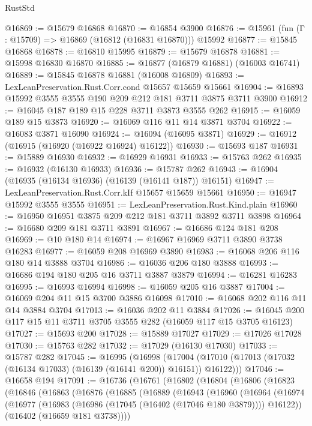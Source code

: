 \begin{lexlean}{RustStd}
\begin{coremodule}
{\begin{coremodule}
{{{{{{{{{{{{{{{{{{{{{{{{{{{{{{{{{{{{{{{{{{{{{{{@16869 := @15679 @16868
@16870 := @16854 @3900
@16876 := @15961 (fun (Γ : @15709) => @16869 (@16812 (@16831 @16870))) @15992
@16877 := @15845 @16868
@16878 := @16810 @15995
@16879 := @15679 @16878
@16881 := @15998 @16830 @16870
@16885 := @16877 (@16879 @16881) (@16003 @16741)
@16889 := @15845 @16878 @16881 (@16008 @16809)
@16893 := LexLeanPreservation.Rust.Corr.cond @15657 @15659 @15661
@16904 := @16893 @15992 @3555 @3555 @190 @209 @212 @181 @3711 @3875 @3711 @3900
@16912 := @16045 @187 @189 @15 @228 @3711 @3873 @3555 @262
@16915 := @16059 @189 @15 @3873
@16920 := @16069 @116 @11 @14 @3871 @3704
@16922 := @16083 @3871 @16090
@16924 := @16094 (@16095 @3871)
@16929 := @16912 (@16915 (@16920 (@16922 @16924) @16122))
@16930 := @15693 @187
@16931 := @15889 @16930
@16932 := @16929 @16931
@16933 := @15763 @262
@16935 := @16932 (@16130 @16933)
@16936 := @15787 @262
@16943 := @16904 (@16935 (@16134 @16936) (@16139 (@16141 @187)) @16151)
@16947 := LexLeanPreservation.Rust.Corr.kIf @15657 @15659 @15661
@16950 := @16947 @15992 @3555 @3555
@16951 := LexLeanPreservation.Rust.Kind.plain
@16960 := @16950 @16951 @3875 @209 @212 @181 @3711 @3892 @3711 @3898
@16964 := @16680 @209 @181 @3711 @3891
@16967 := @16686 @124 @181 @208
@16969 := @10 @180 @14
@16974 := @16967 @16969 @3711 @3890 @3738 @16283
@16977 := @16059 @208 @16969 @3890
@16983 := @16068 @206 @116 @180 @14 @3888 @3704
@16986 := @16036 @206 @180 @3888
@16993 := @16686 @194 @180 @205 @16 @3711 @3887 @3879
@16994 := @16281 @16283
@16995 := @16993 @16994
@16998 := @16059 @205 @16 @3887
@17004 := @16069 @204 @11 @15 @3700 @3886 @16098
@17010 := @16068 @202 @116 @11 @14 @3884 @3704
@17013 := @16036 @202 @11 @3884
@17026 := @16045 @200 @117 @15 @11 @3711 @3705 @3555 @282 (@16059 @117 @15 @3705 @16123)
@17027 := @15693 @200
@17028 := @15889 @17027
@17029 := @17026 @17028
@17030 := @15763 @282
@17032 := @17029 (@16130 @17030)
@17033 := @15787 @282
@17045 := @16995
    (@16998
      (@17004 (@17010 (@17013 (@17032 (@16134 @17033) (@16139 (@16141 @200)) @16151)) @16122)))
@17046 := @16658 @194
@17091 := @16736
    (@16761
      (@16802
        (@16804
          (@16806
            (@16823
              (@16846
                (@16863
                  (@16876
                    (@16885
                      (@16889
                        (@16943
                          (@16960
                            (@16964
                              (@16974
                                (@16977
                                  (@16983 (@16986 (@17045 (@16402 (@17046 @180 @3879)))) @16122))
                                (@16402 (@16659 @181 @3738))))
}}}}}}}}}}}}}}}}}}}}}}}}}}}}}}}}}}}}}}}}}}}}}}}
\end{coremodule}}
\end{coremodule}
\end{lexlean}
